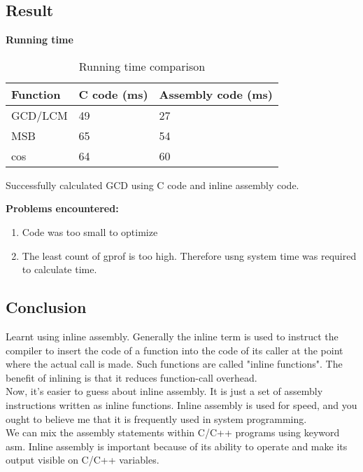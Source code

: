 \documentclass[paper=a4, fontsize=11pt]{scrartcl} %
\numberwithin{equation}{section} %
\numberwithin{figure}{section} %
\numberwithin{table}{section} %
\begin{document}
\subsection{Result}

\textbf{Running time}

\begin{table}[h]
\centering
\begin{tabular}{@{}lll@{}}
\toprule
\textbf{Function} & C code (ms) & Assembly code (ms)  \\ \midrule

GCD/LCM  & 49          & 27                 \\
MSB      & 65          & 54                 \\
cos      & 64          & 60                \\ \bottomrule
\end{tabular}
\caption{Running time comparison}
\label{Running time comparison}
\end{table}


Successfully calculated GCD using C code and inline assembly code.

\textbf{Problems encountered:}
\begin{enumerate}
\item Code was too small to optimize
\item The least count of gprof is too high. Therefore usng system time was required to calculate time.
\end{enumerate}

\subsection{Conclusion}
Learnt using inline assembly. Generally the inline term is used to instruct the compiler to insert the code of a function into the code of its caller at the point where the actual call is made. Such functions are called "inline functions". The benefit of inlining is that it reduces function-call overhead.\\

Now, it's easier to guess about inline assembly. It is just a set of assembly instructions written as inline functions. Inline assembly is used for speed, and you ought to believe me that it is frequently used in system programming.\\

We can mix the assembly statements within C/C++ programs using keyword asm. Inline assembly is important because of its ability to operate and make its output visible on C/C++ variables.\\
\end{document}
